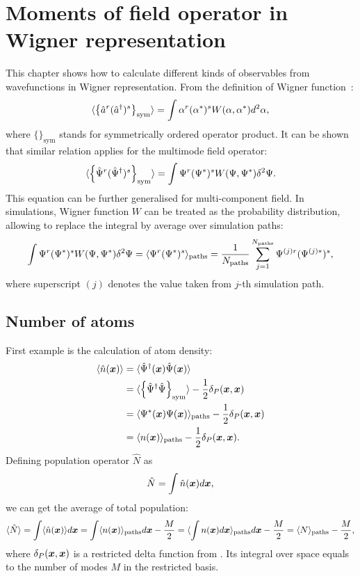 \chapter{Moments of field operator in Wigner representation}
\label{cha:appendix:moments-calculation}


This chapter shows how to calculate different kinds of observables from wavefunctions in Wigner representation.
From the definition of Wigner function~\cite{Gardiner2004}:
\[
	\langle \left\{  \hat{a}^r ( \hat{a}^\dagger)^s  \right\}_{\mathrm{sym}} \rangle
	= \int \alpha^r (\alpha^*)^s W (\alpha, \alpha^*) d^2\alpha ,
\]
where $\{\}_{\mathrm{sym}}$ stands for symmetrically ordered operator product.
It can be shown that similar relation applies for the multimode field operator:
\[
	\langle \left\{  \hat{\Psi}^r ( \hat{\Psi}^\dagger)^s  \right\}_{\mathrm{sym}} \rangle
	= \int \Psi^r (\Psi^*)^s W (\Psi, \Psi^*) \delta^2\Psi.
\]
This equation can be further generalised for multi-component field.
In simulations, Wigner function $W$ can be treated as the probability distribution, allowing to replace the integral by average over simulation paths:
\[
	\int \Psi^r (\Psi^*)^s W (\Psi, \Psi^*) \delta^2\Psi
	= \langle  \Psi^r (\Psi^*)^s  \rangle_{\mathrm{paths}}
	= \frac{1}{N_{\mathrm{paths}}} \sum\limits_{j=1}^{N_{\mathrm{paths}}}
		\Psi^{(j)r} (\Psi^{(j)*})^s,
\]
where superscript $(j)$ denotes the value taken from $j$-th simulation path.


\section{Number of atoms}

First example is the calculation of atom density:
\begin{equation*}
\begin{split}
		\langle \hat{n} (\boldsymbol{x}) \rangle
		& = \langle \hat{\Psi}^\dagger (\boldsymbol{x}) \hat{\Psi} (\boldsymbol{x}) \rangle \\
		& = \langle
				\left\{  \hat{\Psi}^\dagger \hat{\Psi}  \right\}_{\mathrm{sym}}
			\rangle - \frac{1}{2} \delta_P (\boldsymbol{x}, \boldsymbol{x}) \\
		& = \langle  \Psi^* (\boldsymbol{x}) \Psi (\boldsymbol{x})  \rangle_{\mathrm{paths}}
			- \frac{1}{2} \delta_P (\boldsymbol{x}, \boldsymbol{x}) \\
		& = \langle  n (\boldsymbol{x})  \rangle_{\mathrm{paths}}
			- \frac{1}{2} \delta_P (\boldsymbol{x}, \boldsymbol{x}).
\end{split}
\end{equation*}
Defining population operator $\hat{N}$ as
\[
	\hat{N} = \int \hat{n} (\boldsymbol{x}) d\boldsymbol{x},
\]
we can get the average of total population:
\[
		\langle \hat{N} \rangle
		= \int \langle \hat{n}(\boldsymbol{x}) \rangle d\boldsymbol{x}
		= \int \langle  n(\boldsymbol{x})  \rangle_{\mathrm{paths}} d\boldsymbol{x} - \frac{M}{2}
		= \langle  \int n(\boldsymbol{x}) d\boldsymbol{x}  \rangle_{\mathrm{paths}} d\boldsymbol{x} - \frac{M}{2}
		= \langle N \rangle_{\mathrm{paths}} - \frac{M}{2},
\]
where $\delta_P (\boldsymbol{x}, \boldsymbol{x})$ is a restricted delta function from .
Its integral over space equals to the number of modes $M$ in the restricted basis.

